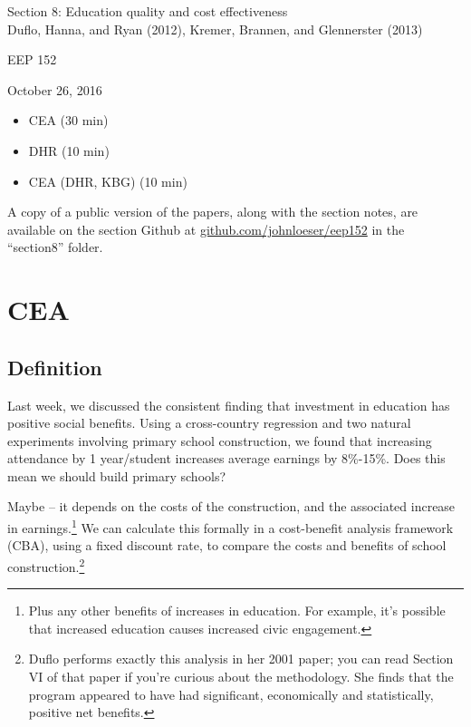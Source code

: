 \documentclass[12pt,english]{article}
\begin{document}
\begin{center}
{\Large{}Section 8: Education quality and cost effectiveness} \\
{\large{}Duflo, Hanna, and Ryan (2012), Kremer, Brannen, and Glennerster (2013)}
\par\end{center}{\Large \par}

\begin{center}
EEP 152
\par\end{center}

\begin{center}
October 26, 2016
\par\end{center}

\begin{itemize}
	\setlength\itemsep{-0.5em}
	\item CEA (30 min)
	\item DHR (10 min)
	\item CEA (DHR,  KBG) (10 min)
\end{itemize}
A copy of a public version of the papers, along with the section notes, are available on the section Github at \href{github.com/johnloeser/eep152}{github.com/johnloeser/eep152} in the ``section8'' folder.

\section{CEA}

\subsection{Definition}

Last week, we discussed the consistent finding that investment in education has positive social benefits. Using a cross-country regression and two natural experiments involving primary school construction, we found that increasing attendance by 1 year/student increases average earnings by 8\%-15\%. Does this mean we should build primary schools?

Maybe -- it depends on the costs of the construction, and the associated increase in earnings.\footnote{Plus any other benefits of increases in education. For example, it's possible that increased education causes increased civic engagement.} We can calculate this formally in a cost-benefit analysis framework (CBA), using a fixed discount rate, to compare the costs and benefits of school construction.\footnote{Duflo performs exactly this analysis in her 2001 paper; you can read Section VI of that paper if you're curious about the methodology. She finds that the program appeared to have had significant, economically and statistically, positive net benefits.}
\end{document}
